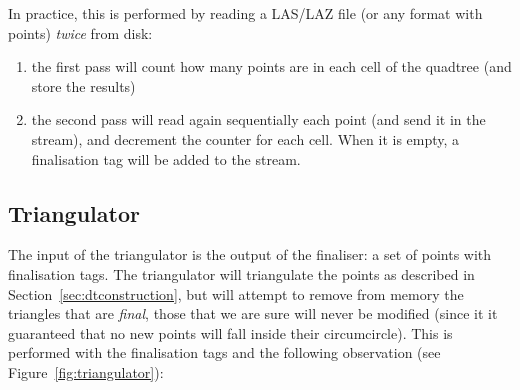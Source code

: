 In practice, this is performed by reading a LAS/LAZ file (or any format with points) \emph{twice} from disk: 
\begin{enumerate}
  \item the first pass will count how many points are in each cell of the quadtree (and store the results)
  \item the second pass will read again sequentially each point (and send it in the stream), and decrement the counter for each cell. When it is empty, a finalisation tag will be added to the stream.
\end{enumerate}


\subsection{Triangulator}
The input of the triangulator is the output of the finaliser: a set of points with finalisation tags.
The triangulator will triangulate the points as described in Section~\ref{sec:dtconstruction}, but will attempt to remove from memory the triangles that are \emph{final}, those that we are sure will never be modified (since it it guaranteed that no new points will fall inside their circumcircle).
This is performed with the finalisation tags and the following observation (see Figure~\ref{fig:triangulator}): 
